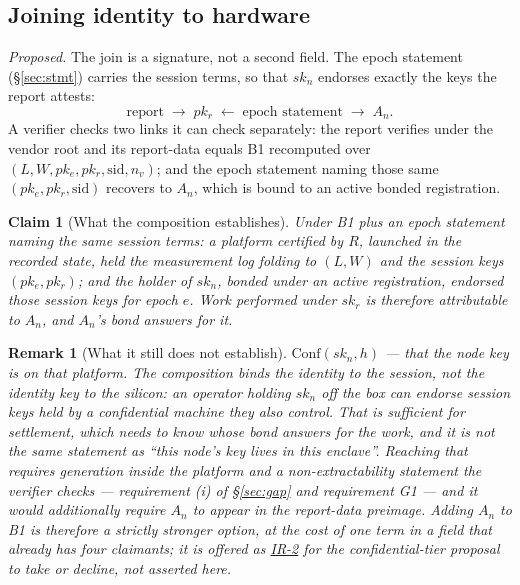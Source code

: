 \documentclass[11pt,a4paper]{article}
\newtheorem{claim}[definition]{Claim}
\newtheorem{remark}[definition]{Remark}
\newcommand{\Conf}{\mathrm{Conf}}
\begin{document}
\subsection{Joining identity to hardware}

\emph{Proposed.} The join is a signature, not a second field. The epoch statement
(\S\ref{sec:stmt}) carries the session terms, so that $sk_n$ endorses exactly the
keys the report attests:
\[
\text{report} \;\longrightarrow\; pk_r \;\longleftarrow\; \text{epoch statement}
\;\longrightarrow\; A_n .
\]
A verifier checks two links it can check separately: the report verifies under the
vendor root and its report-data equals B1 recomputed over $(L, W, pk_e, pk_r,
\mathrm{sid}, n_v)$; and the epoch statement naming those same $(pk_e, pk_r,
\mathrm{sid})$ recovers to $A_n$, which is bound to an active bonded registration.

\begin{claim}[What the composition establishes]\label{cl:bind}
Under B1 plus an epoch statement naming the same session terms: a platform
certified by $R$, launched in the recorded state, held the measurement log folding
to $(L,W)$ and the session keys $(pk_e, pk_r)$; and the holder of $sk_n$, bonded
under an active registration, endorsed those session keys for epoch $e$. Work
performed under $sk_r$ is therefore attributable to $A_n$, and $A_n$'s bond answers
for it.
\end{claim}

\begin{remark}[What it still does not establish]
$\Conf(sk_n, h)$ --- that the node key is on that platform. The composition binds
the identity to the \emph{session}, not the identity key to the \emph{silicon}: an
operator holding $sk_n$ off the box can endorse session keys held by a confidential
machine they also control. That is sufficient for settlement, which needs to know
whose bond answers for the work, and it is not the same statement as ``this node's
key lives in this enclave''. Reaching that requires generation inside the platform
and a non-extractability statement the verifier checks --- requirement (i) of
\S\ref{sec:gap} and requirement G1 --- and it would additionally require $A_n$ to
appear in the report-data preimage. Adding $A_n$ to B1 is therefore a strictly
stronger option, at the cost of one term in a field that already has four
claimants; it is offered as \hyperref[sec:req]{IR-2} for the confidential-tier
proposal to take or decline, not asserted here.
\end{remark}
\end{document}

